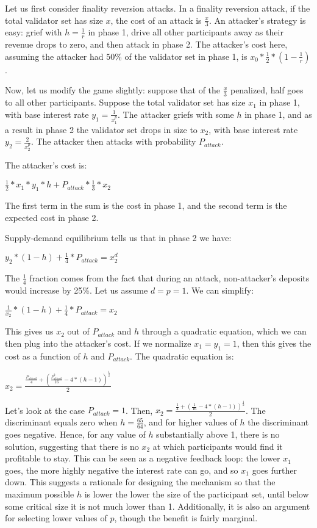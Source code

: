 \documentclass[12pt]{article}
\begin{document}
Let us first consider finality reversion attacks. In a finality reversion attack, if the total validator set has size $x$, the cost of an attack is $\frac{x}{3}$. An attacker's strategy is easy: grief with $h = \frac{1}{r}$ in phase 1, drive all other participants away as their revenue drops to zero, and then attack in phase 2. The attacker's cost here, assuming the attacker had $50\%$ of the validator set in phase 1, is $x_0 * \frac{1}{2} * (1 - \frac{1}{r})$.

Now, let us modify the game slightly: suppose that of the $\frac{x}{3}$ penalized, half goes to all other participants. Suppose the total validator set has size $x_1$ in phase 1, with base interest rate $y_1 = \frac{1}{x_1^p}$. The attacker griefs with some $h$ in phase 1, and as a result in phase 2 the validator set drops in size to $x_2$, with base interest rate $y_2 = \frac{2}{x_2^p}$. The attacker then attacks with probability $P_{attack}$.

The attacker's cost is:

$\frac{1}{2} * x_1 * y_1 * h + P_{attack} * \frac{1}{3} * x_2$

The first term in the sum is the cost in phase 1, and the second term is the expected cost in phase 2.

Supply-demand equilibrium tells us that in phase 2 we have:

$y_2 * (1-h) + \frac{1}{4} * P_{attack} = x_2^d$

The $\frac{1}{4}$ fraction comes from the fact that during an attack, non-attacker's deposits would increase by 25\%. Let us assume $d = p = 1$. We can simplify:

$\frac{1}{x_2} * (1-h) + \frac{1}{4} * P_{attack} = x_2$

This gives us $x_2$ out of $P_{attack}$ and $h$ through a quadratic equation, which we can then plug into the attacker's cost. If we normalize $x_1 = y_1 = 1$, then this gives the cost as a function of $h$ and $P_{attack}$. The quadratic equation is:

$x_2 = \frac{\frac{P_{attack}}{4} + (\frac{P_{attack}^2}{16} - 4 * (h-1))^{\frac{1}{2}}}{2}$

Let's look at the case $P_{attack} = 1$. Then, $x_2 = \frac{\frac{1}{4} + (\frac{1}{16} - 4 * (h-1))^{\frac{1}{2}}}{2}$. The discriminant equals zero when $h = \frac{65}{64}$, and for higher values of $h$ the discriminant goes negative. Hence, for any value of $h$ substantially above 1, there is no solution, suggesting that there is no $x_2$ at which participants would find it profitable to stay. This can be seen as a negative feedback loop: the lower $x_1$ goes, the more highly negative the interest rate can go, and so $x_1$ goes further down. This suggests a rationale for designing the mechanism so that the maximum possible $h$ is lower the lower the size of the participant set, until below some critical size it is not much lower than 1. Additionally, it is also an argument for selecting lower values of $p$, though the benefit is fairly marginal.
\end{document}
